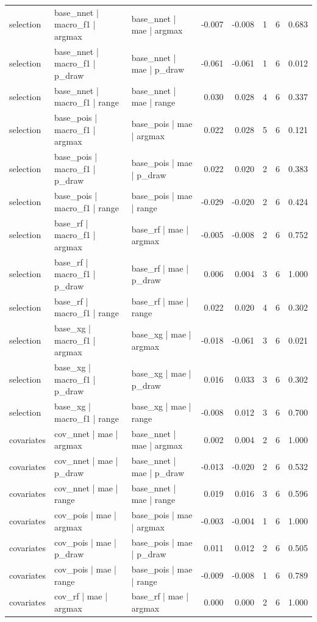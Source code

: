 \begin{tabular}{lllrrrrr}
selection & base\_nnet | macro\_f1 | argmax & base\_nnet | mae | argmax & -0.007 & -0.008 & 1 & 6 & 0.683\\
selection & base\_nnet | macro\_f1 | p\_draw & base\_nnet | mae | p\_draw & -0.061 & -0.061 & 1 & 6 & 0.012\\
selection & base\_nnet | macro\_f1 | range & base\_nnet | mae | range & 0.030 & 0.028 & 4 & 6 & 0.337\\
selection & base\_pois | macro\_f1 | argmax & base\_pois | mae | argmax & 0.022 & 0.028 & 5 & 6 & 0.121\\
selection & base\_pois | macro\_f1 | p\_draw & base\_pois | mae | p\_draw & 0.022 & 0.020 & 2 & 6 & 0.383\\
selection & base\_pois | macro\_f1 | range & base\_pois | mae | range & -0.029 & -0.020 & 2 & 6 & 0.424\\
selection & base\_rf | macro\_f1 | argmax & base\_rf | mae | argmax & -0.005 & -0.008 & 2 & 6 & 0.752\\
selection & base\_rf | macro\_f1 | p\_draw & base\_rf | mae | p\_draw & 0.006 & 0.004 & 3 & 6 & 1.000\\
selection & base\_rf | macro\_f1 | range & base\_rf | mae | range & 0.022 & 0.020 & 4 & 6 & 0.302\\
selection & base\_xg | macro\_f1 | argmax & base\_xg | mae | argmax & -0.018 & -0.061 & 3 & 6 & 0.021\\
selection & base\_xg | macro\_f1 | p\_draw & base\_xg | mae | p\_draw & 0.016 & 0.033 & 3 & 6 & 0.302\\
selection & base\_xg | macro\_f1 | range & base\_xg | mae | range & -0.008 & 0.012 & 3 & 6 & 0.700\\
covariates & cov\_nnet | mae | argmax & base\_nnet | mae | argmax & 0.002 & 0.004 & 2 & 6 & 1.000\\
covariates & cov\_nnet | mae | p\_draw & base\_nnet | mae | p\_draw & -0.013 & -0.020 & 2 & 6 & 0.532\\
covariates & cov\_nnet | mae | range & base\_nnet | mae | range & 0.019 & 0.016 & 3 & 6 & 0.596\\
covariates & cov\_pois | mae | argmax & base\_pois | mae | argmax & -0.003 & -0.004 & 1 & 6 & 1.000\\
covariates & cov\_pois | mae | p\_draw & base\_pois | mae | p\_draw & 0.011 & 0.012 & 2 & 6 & 0.505\\
covariates & cov\_pois | mae | range & base\_pois | mae | range & -0.009 & -0.008 & 1 & 6 & 0.789\\
covariates & cov\_rf | mae | argmax & base\_rf | mae | argmax & 0.000 & 0.000 & 2 & 6 & 1.000\\

\end{tabular}
